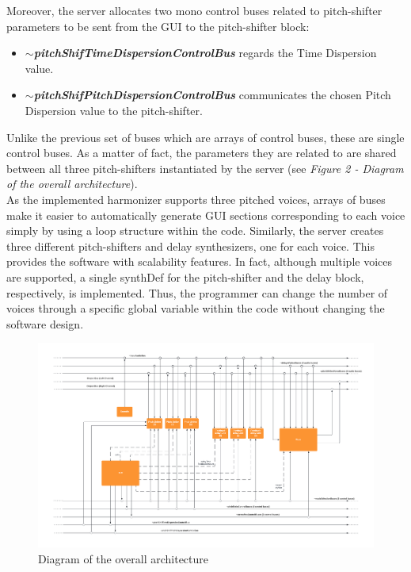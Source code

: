 \documentclass{article}
\begin{document}
Moreover, the server allocates two mono control buses related to pitch-shifter parameters to be sent from the GUI to the pitch-shifter block:

\begin{itemize}
  \item \textbf{\textit{$\sim$pitchShifTimeDispersionControlBus}} regards the Time Dispersion value.
  \item \textbf{\textit{$\sim$pitchShifPitchDispersionControlBus}} communicates the chosen Pitch Dispersion value to the pitch-shifter.
\end{itemize}

Unlike the previous set of buses which are arrays of control buses, these are single control buses. As a matter of fact, the parameters they are related to are shared between all three pitch-shifters instantiated by the server (see \textit{Figure 2 - Diagram of the overall architecture}).  
\\As the implemented harmonizer supports three pitched voices, arrays of buses make it easier to automatically generate GUI sections corresponding to each voice simply by using a loop structure within the code. Similarly, the server creates three different pitch-shifters and delay synthesizers, one for each voice. This provides the software with scalability features. In fact, although multiple voices are supported, a single synthDef for the pitch-shifter and the delay block, respectively, is implemented. Thus, the programmer can change the number of voices through a specific global variable within the code without changing the software design.


\begin{figure}[H]
\centering
  \includegraphics[width=1.0\textwidth]{Software_Architecture.png}
    \caption{Diagram of the overall architecture}
\end{figure}
\end{document}

